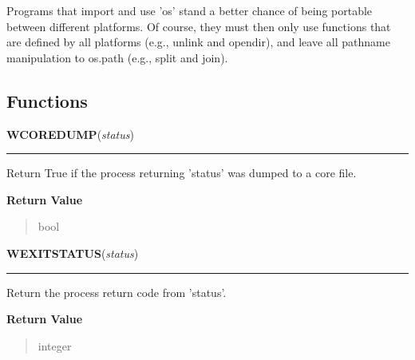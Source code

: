 Programs that import and use 'os' stand a better chance of being portable 
between different platforms.  Of course, they must then only use functions 
that are defined by all platforms (e.g., unlink and opendir), and leave all
pathname manipulation to os.path (e.g., split and join).



  \subsection{Functions}

    \label{os:WCOREDUMP}

    \vspace{0.5ex}

\hspace{.8\funcindent}\begin{boxedminipage}{\funcwidth}

    \raggedright \textbf{WCOREDUMP}(\textit{status})

    \vspace{-1.5ex}

    \rule{\textwidth}{0.5\fboxrule}
\setlength{\parskip}{2ex}
    Return True if the process returning 'status' was dumped to a core 
    file.

\setlength{\parskip}{1ex}
      \textbf{Return Value}
    \vspace{-1ex}

      \begin{quote}
      bool

      \end{quote}

    \end{boxedminipage}

    \label{os:WEXITSTATUS}

    \vspace{0.5ex}

\hspace{.8\funcindent}\begin{boxedminipage}{\funcwidth}

    \raggedright \textbf{WEXITSTATUS}(\textit{status})

    \vspace{-1.5ex}

    \rule{\textwidth}{0.5\fboxrule}
\setlength{\parskip}{2ex}
    Return the process return code from 'status'.

\setlength{\parskip}{1ex}
      \textbf{Return Value}
    \vspace{-1ex}

      \begin{quote}
      integer

      \end{quote}

    \end{boxedminipage}

